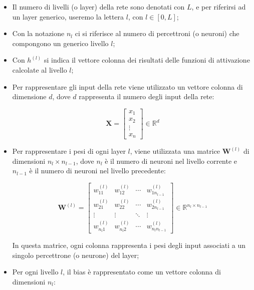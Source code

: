 \begin{itemize}
    \item Il numero di livelli (o layer) della rete sono denotati con $L$,
    e per riferirsi ad un layer generico, useremo la lettera $l$, con $l\in [0, L]$; 

    \item Con la notazione $n_l$ ci si riferisce al numero di percettroni (o neuroni)
    che compongono un generico livello $l$;

    \item Con $h^{(l)}$ si indica il vettore colonna dei risultati delle funzioni 
    di attivazione calcolate al livello $l$;

    \item Per rappresentare gli input della rete viene utilizzato un vettore colonna di dimensione $d$,
    dove $d$ rappresenta il numero degli input della rete:
    
    \[
        \mathbf{X} = \begin{bmatrix} x_1 \\ x_2 \\ \vdots \\ x_n \end{bmatrix} \in \mathbb{R}^d
    \]

    \item Per rappresentare i pesi di ogni layer $l$, viene utilizzata una matrice $\mathbf{W}^{(l)}$ di dimensioni
    $n_l \times n_{l-1}$, dove $n_l$ è il numero di neuroni nel livello corrente 
    e $n_{l-1}$ è il numero di neuroni nel livello precedente:
    
    \[
        \mathbf{W}^{(l)} = 
        \begin{bmatrix}
        w_{11}^{(l)} & w_{12}^{(l)} & \cdots & w_{1n_{l-1}}^{(l)} \\
        w_{21}^{(l)} & w_{22}^{(l)} & \cdots & w_{2n_{l-1}}^{(l)} \\
        \vdots & \vdots & \ddots & \vdots \\
        w_{n_l1}^{(l)} & w_{n_l2}^{(l)} & \cdots & w_{n_ln_{l-1}}^{(l)}
        \end{bmatrix}
        \in \mathbb{R}^{n_l \times n_{l-1}}
    \]

    In questa matrice, ogni colonna rappresenta i pesi degli input associati a
    un singolo percettrone (o neurone) del layer;
    

    \item Per ogni livello $l$, il bias è rappresentato come un vettore 
    colonna di dimensioni $n_l$:
    

\end{itemize}
